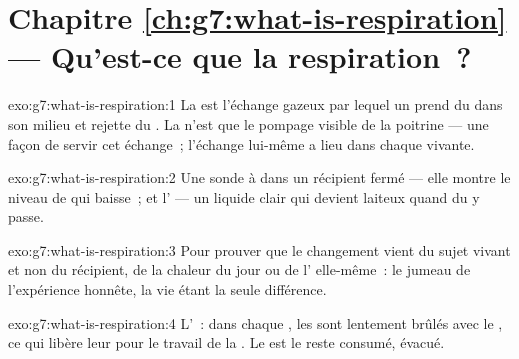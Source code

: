 \section*{Chapitre \ref{ch:g7:what-is-respiration} --- Qu'est-ce que la respiration~?}

\begin{solution}{exo:g7:what-is-respiration:1}
La  est l'échange gazeux par lequel un  prend
du  dans son milieu et rejette du . La
 n'est que le pompage visible de la poitrine --- une
façon de servir cet échange~; l'échange lui-même a lieu dans chaque
 vivante.
\end{solution}

\begin{solution}{exo:g7:what-is-respiration:2}
Une sonde à  dans un récipient fermé --- elle montre le
niveau de  qui baisse~; et l' --- un liquide
clair qui devient laiteux quand du  y passe.
\end{solution}

\begin{solution}{exo:g7:what-is-respiration:3}
Pour prouver que le changement vient du sujet vivant et non du
récipient, de la chaleur du jour ou de l' elle-même~: le
jumeau de l'expérience honnête, la vie étant la seule différence.
\end{solution}

\begin{solution}{exo:g7:what-is-respiration:4}
L'~: dans chaque , les  sont lentement
brûlés avec le , ce qui libère leur  pour le travail
de la . Le  est le reste consumé, évacué.
\end{solution}

